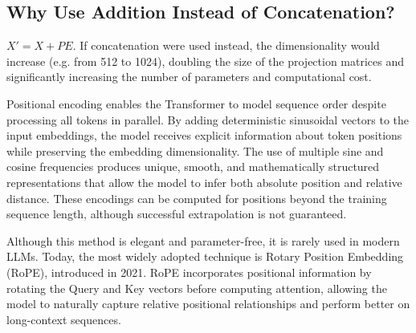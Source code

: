 \subsection{Why Use Addition Instead of Concatenation?}
$X' = X + PE$. If concatenation were used instead, the dimensionality would increase (e.g. from 512 to 1024), doubling the size of the projection matrices and significantly increasing the number of parameters and computational cost.

Positional encoding enables the Transformer to model sequence order despite processing all tokens in parallel. By adding deterministic sinusoidal vectors to the input embeddings, the model receives explicit information about token positions while preserving the embedding dimensionality. The use of multiple sine and cosine frequencies produces unique, smooth, and mathematically structured representations that allow the model to infer both absolute position and relative distance. These encodings can be computed for positions beyond the training sequence length, although successful extrapolation is not guaranteed.

Although this method is elegant and parameter-free, it is rarely used in modern LLMs. Today, the most widely adopted technique is Rotary Position Embedding (RoPE), introduced in 2021. RoPE incorporates positional information by rotating the Query and Key vectors before computing attention, allowing the model to naturally capture relative positional relationships and perform better on long-context sequences.


